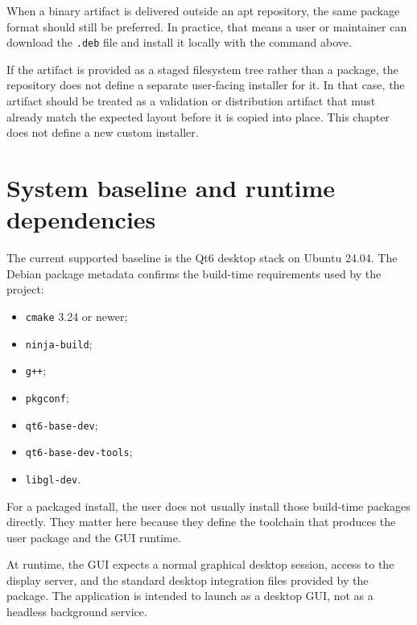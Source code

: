 When a binary artifact is delivered outside an apt repository, the same package
format should still be preferred. In practice, that means a user or maintainer
can download the \texttt{.deb} file and install it locally with the command
above.

If the artifact is provided as a staged filesystem tree rather than a package,
the repository does not define a separate user-facing installer for it. In that
case, the artifact should be treated as a validation or distribution artifact
that must already match the expected layout before it is copied into place.
This chapter does not define a new custom installer.

\section{System baseline and runtime dependencies}
\label{sec:user-installation-runtime-dependencies}

The current supported baseline is the Qt6 desktop stack on Ubuntu 24.04.
The Debian package metadata confirms the build-time requirements used by the
project:
\begin{itemize}
\item \texttt{cmake} 3.24 or newer;
\item \texttt{ninja-build};
\item \texttt{g++};
\item \texttt{pkgconf};
\item \texttt{qt6-base-dev};
\item \texttt{qt6-base-dev-tools};
\item \texttt{libgl-dev}.
\end{itemize}

For a packaged install, the user does not usually install those build-time
packages directly. They matter here because they define the toolchain that
produces the user package and the GUI runtime.

At runtime, the GUI expects a normal graphical desktop session, access to the
display server, and the standard desktop integration files provided by the
package. The application is intended to launch as a desktop GUI, not as a
headless background service.

